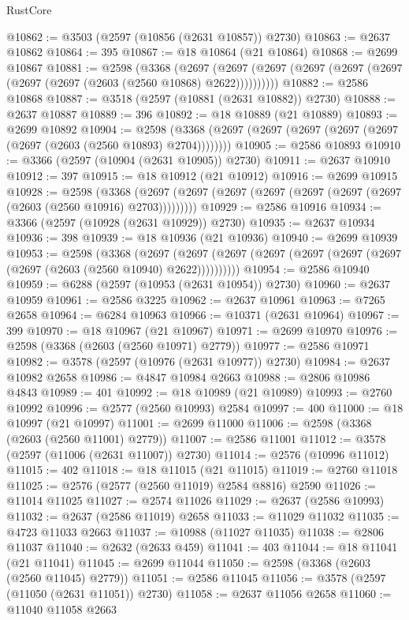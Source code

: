 \begin{lexlean}{RustCore}
\begin{coremodule}
@10862 := @3503 (@2597 (@10856 (@2631 @10857)) @2730)
@10863 := @2637 @10862
@10864 := 395
@10867 := @18 @10864 (@21 @10864)
@10868 := @2699 @10867
@10881 := @2598
    (@3368
      (@2697 (@2697 (@2697 (@2697 (@2697 (@2697 (@2697 (@2697 (@2603 (@2560 @10868) @2622))))))))))
@10882 := @2586 @10868
@10887 := @3518 (@2597 (@10881 (@2631 @10882)) @2730)
@10888 := @2637 @10887
@10889 := 396
@10892 := @18 @10889 (@21 @10889)
@10893 := @2699 @10892
@10904 := @2598 (@3368 (@2697 (@2697 (@2697 (@2697 (@2697 (@2697 (@2603 (@2560 @10893) @2704))))))))
@10905 := @2586 @10893
@10910 := @3366 (@2597 (@10904 (@2631 @10905)) @2730)
@10911 := @2637 @10910
@10912 := 397
@10915 := @18 @10912 (@21 @10912)
@10916 := @2699 @10915
@10928 := @2598
    (@3368 (@2697 (@2697 (@2697 (@2697 (@2697 (@2697 (@2697 (@2603 (@2560 @10916) @2703)))))))))
@10929 := @2586 @10916
@10934 := @3366 (@2597 (@10928 (@2631 @10929)) @2730)
@10935 := @2637 @10934
@10936 := 398
@10939 := @18 @10936 (@21 @10936)
@10940 := @2699 @10939
@10953 := @2598
    (@3368
      (@2697 (@2697 (@2697 (@2697 (@2697 (@2697 (@2697 (@2697 (@2603 (@2560 @10940) @2622))))))))))
@10954 := @2586 @10940
@10959 := @6288 (@2597 (@10953 (@2631 @10954)) @2730)
@10960 := @2637 @10959
@10961 := @2586 @3225
@10962 := @2637 @10961
@10963 := @7265 @2658
@10964 := @6284 @10963
@10966 := @10371 (@2631 @10964)
@10967 := 399
@10970 := @18 @10967 (@21 @10967)
@10971 := @2699 @10970
@10976 := @2598 (@3368 (@2603 (@2560 @10971) @2779))
@10977 := @2586 @10971
@10982 := @3578 (@2597 (@10976 (@2631 @10977)) @2730)
@10984 := @2637 @10982 @2658
@10986 := @4847 @10984 @2663
@10988 := @2806 @10986 @4843
@10989 := 401
@10992 := @18 @10989 (@21 @10989)
@10993 := @2760 @10992
@10996 := @2577 (@2560 @10993) @2584
@10997 := 400
@11000 := @18 @10997 (@21 @10997)
@11001 := @2699 @11000
@11006 := @2598 (@3368 (@2603 (@2560 @11001) @2779))
@11007 := @2586 @11001
@11012 := @3578 (@2597 (@11006 (@2631 @11007)) @2730)
@11014 := @2576 (@10996 @11012)
@11015 := 402
@11018 := @18 @11015 (@21 @11015)
@11019 := @2760 @11018
@11025 := @2576 (@2577 (@2560 @11019) @2584 @8816) @2590
@11026 := @11014 @11025
@11027 := @2574 @11026
@11029 := @2637 (@2586 @10993)
@11032 := @2637 (@2586 @11019) @2658
@11033 := @11029 @11032
@11035 := @4723 @11033 @2663
@11037 := @10988 (@11027 @11035)
@11038 := @2806 @11037
@11040 := @2632 (@2633 @459)
@11041 := 403
@11044 := @18 @11041 (@21 @11041)
@11045 := @2699 @11044
@11050 := @2598 (@3368 (@2603 (@2560 @11045) @2779))
@11051 := @2586 @11045
@11056 := @3578 (@2597 (@11050 (@2631 @11051)) @2730)
@11058 := @2637 @11056 @2658
@11060 := @11040 @11058 @2663

\end{coremodule}
\end{lexlean}
